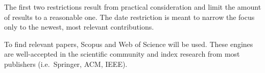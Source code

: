 The first two restrictions result from practical consideration and limit the amount of results to a reasonable one.
The date restriction is meant to narrow the focus only to the newest, most relevant contributions.

To find relevant papers, Scopus and Web of Science will be used.
These engines are well-accepted in the scientific community and index research from most publishers (i.e.\ Springer, ACM, IEEE).
